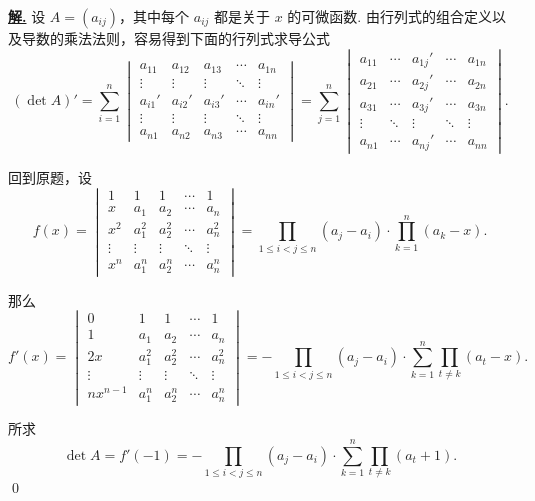 \documentclass[10pt,openany]{article}
\theoremstyle{thmstyle} %
\theoremstyle{defstyle} %
\theoremstyle{prostyle} %
\theoremstyle{exastyle}
\theoremstyle{remstyle}
\newenvironment{solution}{\par\underline{\textbf{解.}} \;\fangsong}{\qed\par}
\begin{document}
\begin{solution}
	设 \( A=(a_{ij}) \)，其中每个 \( a_{ij} \) 都是关于 \( x \) 的可微函数. 由行列式的组合定义以及导数的乘法法则，容易得到下面的行列式求导公式
	\[ (\det A)'= \sum_{i=1}^{n} \begin{vmatrix}
		a_{11} & a_{12} & a_{13} & \cdots & a_{1n} \\
		\vdots & \vdots & \vdots & \ddots & \vdots \\
		a_{i1}' & a_{i2}' & a_{i3}' & \cdots & a_{in}' \\
		\vdots & \vdots & \vdots & \ddots & \vdots \\
		a_{n1} & a_{n2} & a_{n3} & \cdots & a_{nn} 
	\end{vmatrix} = \sum_{j=1}^{n} \begin{vmatrix}
		a_{11} & \cdots & a_{1j}' & \cdots & a_{1n} \\
		a_{21} & \cdots & a_{2j}' & \cdots & a_{2n} \\
		a_{31} & \cdots & a_{3j}' & \cdots & a_{3n} \\
		\vdots & \ddots & \vdots & \ddots & \vdots \\
		a_{n1} & \cdots & a_{nj}' & \cdots & a_{nn} 
	\end{vmatrix}. \]
	
	回到原题，设
	\[ f(x)= \begin{vmatrix}
		1 & 1 & 1 & \cdots & 1 \\
		x & a_1 & a_2 & \cdots & a_n \\
		x^2 & a_1^{2} & a_2^{2} & \cdots & a_n^{2} \\
		\vdots & \vdots & \vdots & \ddots & \vdots \\
		x^n & a_1^{n} & a_2^{n} & \cdots & a_n^{n}
	\end{vmatrix}=\prod_{1 \leq i<j \leq n}^{} (a_j-a_i) \cdot \prod_{k=1}^{n} (a_k-x). \]
	
	那么
	\[ f'(x)= \begin{vmatrix}
		0 & 1 & 1 & \cdots & 1 \\
		1 & a_1 & a_2 & \cdots & a_n \\
		2x & a_1^{2} & a_2^{2} & \cdots & a_n^{2} \\
		\vdots & \vdots & \vdots & \ddots & \vdots \\
		nx^{n-1} & a_1^{n} & a_2^{n} & \cdots & a_n^{n}
	\end{vmatrix} = -\prod_{1 \leq i<j \leq n}^{} (a_j-a_i) \cdot \sum_{k=1}^{n}  \prod_{t \neq k}^{} (a_t-x). \]
	
	所求 
	\[ \det A= f'(-1)= -\prod_{1 \leq i<j \leq n}^{} (a_j-a_i) \cdot \sum_{k=1}^{n}  \prod_{t \neq k}^{} (a_t+1). \]
\end{solution}
\end{document}
